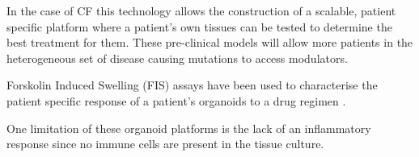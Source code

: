In the case of CF this technology allows the construction of a scalable, patient specific platform where a patient's own tissues can be tested to determine the best treatment for them. These pre-clinical models will allow more patients in the heterogeneous set of disease causing mutations to access modulators. 

Forskolin Induced Swelling (FIS) assays have been used to characterise the patient specific response of a patient's organoids to a drug regimen \cite{dekkers2013}. 


One limitation of these organoid platforms is the lack of an inflammatory response since no immune cells are present in the tissue culture. 


%
